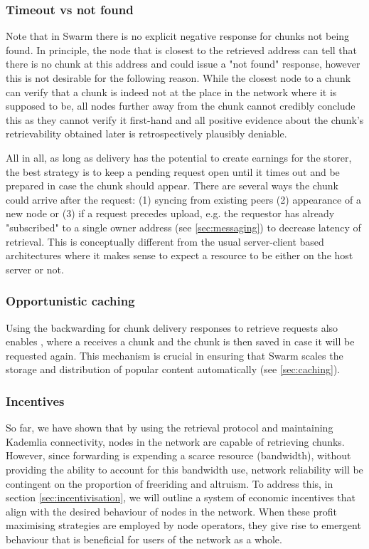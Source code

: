 \subsubsection{Timeout vs not found}

Note that in Swarm there is no explicit negative response for chunks not being found. In principle, the node that is closest to the retrieved address can tell that there is no chunk at this address and could issue a "not found" response, however this is not desirable for the following reason. While the closest node to a chunk can verify that a chunk is indeed not at the place in the network where it is supposed to be, all nodes further away from the chunk cannot credibly conclude this as they cannot verify it first-hand and all positive evidence about the chunk's retrievability obtained later is retrospectively plausibly deniable. 

All in all, as long as delivery has the potential to create earnings for the storer, the best strategy is to keep a pending request open until it times out and be prepared in case the chunk should appear. There are several ways the chunk could arrive after the request: (1) syncing from existing peers (2) appearance of a new node or (3) if a request precedes upload, e.g. the requestor has already "subscribed" to a single owner address (see \ref{sec:messaging}) to decrease latency of retrieval. This is conceptually different from the usual server-client based architectures where it makes sense to expect a resource to be either on the host server or not. 
 

\subsubsection{Opportunistic caching}

Using the backwarding for chunk delivery responses to retrieve requests also enables , where a  receives a chunk and the chunk is then saved in case it will be requested again. This mechanism is crucial in ensuring that Swarm scales the storage and distribution of popular content automatically (see \ref{sec:caching}).

\subsubsection{Incentives}

So far, we have shown that by using the retrieval protocol and maintaining Kademlia connectivity, nodes in the network are capable of retrieving chunks. However, since forwarding is expending a scarce resource (bandwidth), without providing the ability to account for this bandwidth use, network reliability will be contingent on the proportion of freeriding and altruism. To address this, in section \ref{sec:incentivisation}, we will outline a system of economic incentives that align with the desired behaviour of nodes in the network. When these profit maximising strategies are employed by node operators, they give rise to emergent behaviour that is beneficial for users of the network as a whole.
 
